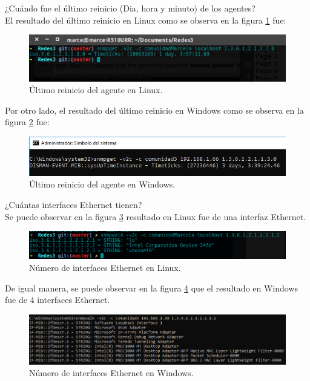 \item ¿Cuándo fue el último reinicio (Dia, hora y minuto)  de los agentes?
\\ El resultado del último reinicio en Linux como se observa en la figura \ref{image:reinicio} fue:

\FloatBarrier
\begin{figure}[htbp!]
		\centering
			\includegraphics[width=.9 \textwidth]{images/Pregunta1}
		\caption{Último reinicio del agente en Linux.}
		\label{image:reinicio}
\end{figure}
\FloatBarrier

Por otro lado, el resultado del último reinicio en Windows como se observa en la figura \ref{image:reinicioW} fue:

\FloatBarrier
\begin{figure}[htbp!]
		\centering
			\includegraphics[width=.9 \textwidth]{images/windows1}
		\caption{Último reinicio del agente en Windows.}
		\label{image:reinicioW}
\end{figure}
\FloatBarrier

\item ¿Cuántas interfaces Ethernet tienen?
\\ Se puede observar en la figura \ref{image:interfaces} resultado en Linux fue de una interfaz Ethernet.
\FloatBarrier
\begin{figure}[htbp!]
		\centering
			\includegraphics[width=.9 \textwidth]{images/Pregunta2L}
		\caption{Número de interfaces Ethernet en Linux.}
		\label{image:interfaces}
\end{figure}
\FloatBarrier

De igual manera, se puede observar en la figura \ref{image:interfacesw} que el resultado en Windows fue de 4 interfaces Ethernet.
\FloatBarrier
\begin{figure}[htbp!]
		\centering
			\includegraphics[width=.9 \textwidth]{images/windows2}
		\caption{Número de interfaces Ethernet en Windows.}
		\label{image:interfacesw}
\end{figure}
\FloatBarrier

